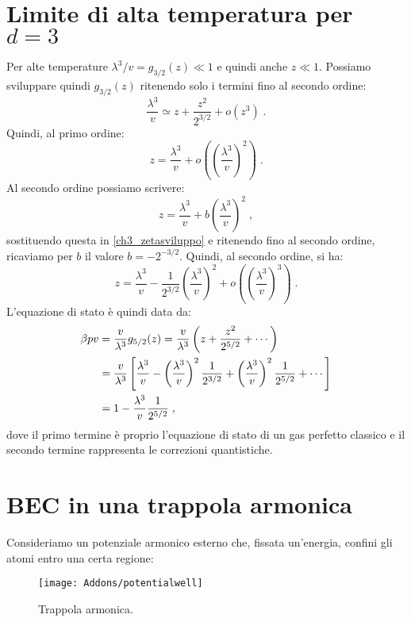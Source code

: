 \documentclass[10pt,a4paper]{report}
\theoremstyle{definition}
\numberwithin{equation}{section}
\begin{document}
\section{Limite di alta temperatura per $d=3$}
Per alte temperature $\lambda^3/v=g_{3/2}(z)\ll 1$ e quindi anche $z\ll 1$. Possiamo sviluppare quindi $g_{3/2}(z)$ ritenendo solo i termini fino al secondo ordine:
\begin{equation}
\frac{\lambda^3}{v}\simeq z+\frac{z^2}{2^{3/2}}+o(z^3)\;. \label{ch3_zetasviluppo}
\end{equation}
Quindi, al primo ordine:
\begin{equation}
z=\frac{\lambda^3}{v}+o\left(\left(\frac{\lambda^3}{v}\right)^2\right)\;.
\end{equation}
Al secondo ordine possiamo scrivere:
$$
z=\frac{\lambda^3}{v}+b\left(\frac{\lambda^3}{v}\right)^2\;,
$$
sostituendo questa in \eqref{ch3_zetasviluppo} e ritenendo fino al secondo ordine, ricaviamo per $b$ il valore $b=-2^{-3/2}$. Quindi, al secondo ordine, si ha:
\begin{equation}
z=\frac{\lambda^3}{v}-\frac{1}{2^{3/2}}\left(\frac{\lambda^3}{v}\right)^2+o\left(\left(\frac{\lambda^3}{v}\right)^3\right)\;.
\end{equation}
L'equazione di stato è quindi data da:
\begin{align}
\beta pv &=\frac{v}{\lambda^3}g_{5/2}(z)=\frac{v}{\lambda^3}\left(z+\frac{z^2}{2^{5/2}}+\cdots\right) \notag \\
&=\frac{v}{\lambda^3}\left[\frac{\lambda^3}{v}-\left(\frac{\lambda^3}{v}\right)^2\frac{1}{2^{3/2}}+\left(\frac{\lambda^3}{v}\right)^2\frac{1}{2^{5/2}}+\cdots\right] \notag \\
&= 1-\frac{\lambda^3}{v}\frac{1}{2^{5/2}}\;,
\end{align}
dove il primo termine è proprio l'equazione di stato di un gas perfetto classico e il secondo termine rappresenta le correzioni quantistiche.
\section{BEC in una trappola armonica}
Consideriamo un potenziale armonico esterno che, fissata un'energia, confini gli atomi entro una certa regione:
\begin{figure}[h]
\centering
\texttt{[image: Addons/potentialwell]}
\caption{\footnotesize{Trappola armonica.}}
\end{figure}
\pagebreak
\end{document}
